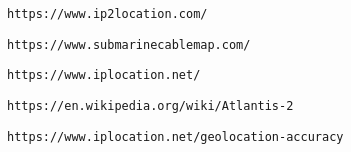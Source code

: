 \begin{thebibliography}{99}

  \texttt{https://www.ip2location.com/}

	\texttt{https://www.submarinecablemap.com/}

	\texttt{https://www.iplocation.net/}

	\texttt{https://en.wikipedia.org/wiki/Atlantis-2}

	\texttt{https://www.iplocation.net/geolocation-accuracy}
\end{thebibliography}